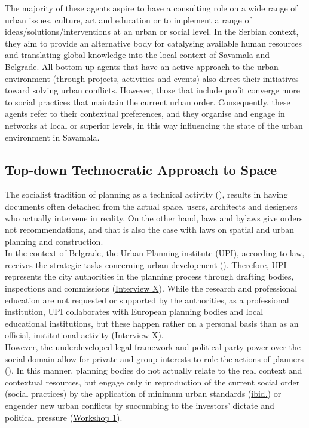 \documentclass[11pt]{report}
\begin{document}
The majority of these agents aspire to have a consulting role on a wide range of urban issues, culture, art and education or to implement a range of ideas/solutions/interventions at an urban or social level.
In the Serbian context, they aim to provide an alternative body for catalysing available human resources and translating global knowledge into the local context of Savamala and Belgrade.
All bottom-up agents that have an active approach to the urban environment (through projects, activities and events) also direct their initiatives toward solving urban conflicts. However, those that include profit converge more to social practices that maintain the current urban order.
Consequently, these agents refer to their contextual preferences, and they organise and engage in networks at local or superior levels, in this way influencing the state of the urban environment in Savamala.
    
\subsection{Top-down Technocratic Approach to Space}

The socialist tradition of planning as a technical activity (\href{ref}{\citealt{vujosevic_planning_2006}}), results in having documents often detached from the actual space, users, architects and designers who actually intervene in reality.
On the other hand, laws and bylaws give orders not recommendations, and 
that is also the case with laws on spatial and urban planning and construction.
\\

In the context of Belgrade, the Urban Planning institute (UPI), according to law, receives the strategic tasks concerning urban development (\cite{PCA}).
Therefore, UPI represents the city authorities in the planning process through drafting bodies, inspections and commissions (\href{InterviewX}{Interview X}).
While the research and professional education are not requested or supported by the authorities, as a professional institution, UPI collaborates with European planning bodies and local educational institutions, but these happen rather on a personal basis than as an official, institutional activity
(\href{InterviewX}{Interview X}).
\\

However, the underdeveloped legal framework and political party power over the social domain allow for private and group interests to rule the actions of planners (\href{ref}{\citealt{vujovic_belgrades_2007}}).
In this manner, planning bodies do not actually relate to the real context and contextual resources, but engage only in reproduction of the current social order (social practices) by the application of minimum urban standards (\href{Vujovic}{ibid.}) or engender new urban conflicts by succumbing to the investors' dictate and political pressure
(\href{Expert Workshop}{Workshop 1}).
\\
\end{document}
